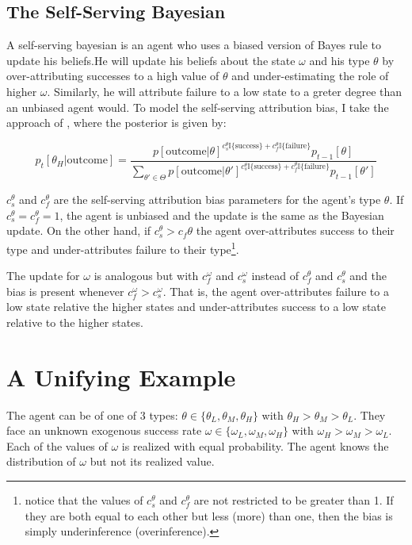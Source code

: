 \documentclass[
  12pt,
]{article}
\begin{document}
\hypertarget{the-self-serving-bayesian}{%
\subsection{The Self-Serving Bayesian}\label{the-self-serving-bayesian}}

A self-serving bayesian is an agent who uses a biased version of Bayes
rule to update his beliefs.He will update his beliefs about the state
\(\omega\) and his type \(\theta\) by over-attributing successes to a
high value of \(\theta\) and under-estimating the role of higher
\(\omega\). Similarly, he will attribute failure to a low state to a
greter degree than an unbiased agent would. To model the self-serving
attribution bias, I take the approach of \citet{benjamin2019}, where the
posterior is given by:

\[
p_{t}[\theta_H|\text{outcome}] = 
\frac{p[\text{outcome}|\theta]^{c_s^{\theta}\mathbb{I}\{\text{success}\}+c_f^{\theta}\mathbb{I}\{\text{failure}\}}p_{t-1}[\theta]}
{\sum_{\theta'\in\Theta}p[\text{outcome}|\theta']^{c_s^{\theta}\mathbb{I}\{\text{success}\}+c_f^{\theta}\mathbb{I}\{\text{failure}\}}p_{t-1}[\theta']}
\]

\(c_s^{\theta}\) and \(c_f^{\theta}\) are the self-serving attribution
bias parameters for the agent's type \(\theta\). If
\(c_s^{\theta} = c_f^{\theta} = 1\), the agent is unbiased and the
update is the same as the Bayesian update. On the other hand, if
\(c_s^{\theta} > c_f{\theta}\) the agent over-attributes success to
their type and under-attributes failure to their type\footnote{
  notice that the values of $c_s^{\theta}$ and $c_f^{\theta}$ are not restricted to be greater than 1. If they are both equal to 
  each other but less (more) than one, then the bias is simply underinference (overinference).}.

The update for \(\omega\) is analogous but with \(c_f^{\omega}\) and
\(c_s^{\omega}\) instead of \(c_f^{\theta}\) and \(c_s^{\theta}\) and
the bias is present whenever \(c_f^{\omega} > c_s^{\omega}\). That is,
the agent over-attributes failure to a low state relative the higher
states and under-attributes success to a low state relative to the
higher states.

\hypertarget{a-unifying-example}{%
\section{A Unifying Example}\label{a-unifying-example}}

The agent can be of one of 3 types:
\(\theta \in \{\theta_L, \theta_M, \theta_H\}\) with
\(\theta_H > \theta_M > \theta_L\). They face an unknown exogenous
success rate \(\omega \in \{\omega_L, \omega_M, \omega_H\}\) with
\(\omega_H>\omega_M>\omega_L\). Each of the values of \(\omega\) is
realized with equal probability. The agent knows the distribution of
\(\omega\) but not its realized value.
\end{document}
